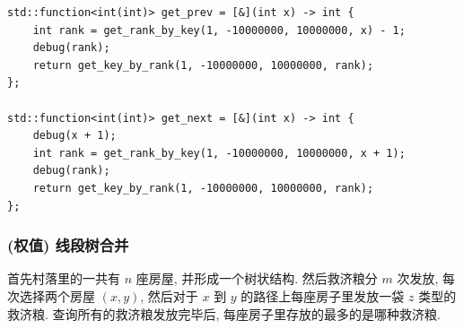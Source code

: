 \documentclass[UTF8, a4paper, titlepage, twoside]{ctexart}
\begin{document}
\begin{lstlisting}[style=cpp]
std::function<int(int)> get_prev = [&](int x) -> int {
    int rank = get_rank_by_key(1, -10000000, 10000000, x) - 1;
    debug(rank);
    return get_key_by_rank(1, -10000000, 10000000, rank);
};

std::function<int(int)> get_next = [&](int x) -> int {
    debug(x + 1);
    int rank = get_rank_by_key(1, -10000000, 10000000, x + 1);
    debug(rank);
    return get_key_by_rank(1, -10000000, 10000000, rank);
};
\end{lstlisting}

\subsubsection*{ (权值) 线段树合并 }
首先村落里的一共有 \(n\) 座房屋, 并形成一个树状结构. 然后救济粮分 \(m\) 次发放, 每次选择两个房屋 \((x,y)\), 然后对于 \(x\) 到 \(y\) 的路径上每座房子里发放一袋 \(z\) 类型的救济粮.
查询所有的救济粮发放完毕后, 每座房子里存放的最多的是哪种救济粮.
\end{document}

